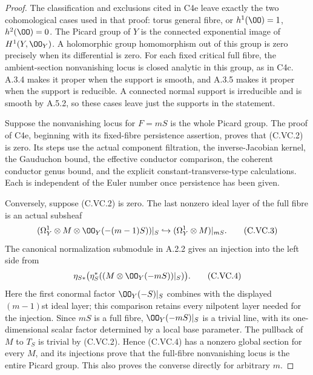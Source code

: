 \begin{proof}
The classification and exclusions cited in C4e leave
exactly the two cohomological cases used in that proof:
torus general fibre, or $h^1(\OO)=1$, $h^2(\OO)=0$.
The Picard group of $Y$ is the connected exponential image
of $H^1(Y,\OO_Y)$. A holomorphic group homomorphism out of
this group is zero precisely when its differential is zero.
For each fixed critical full fibre, the ambient-section
nonvanishing locus is closed analytic in this group, as
in C4c. A.3.4 makes it proper when the support is smooth,
and A.3.5 makes it proper when the support is reducible.
A connected normal support is irreducible and is smooth
by A.5.2, so these cases leave just the supports in the
statement.

Suppose the nonvanishing locus for $F=mS$ is the whole
Picard group. The proof of C4e, beginning with its
fixed-fibre persistence assertion, proves that (C.VC.2)
is zero. Its steps use the actual component filtration,
the inverse-Jacobian kernel, the Gauduchon bound, the
effective conductor comparison, the coherent conductor
genus bound, and the explicit constant-transverse-type
calculations. Each is independent of the Euler number
once persistence has been given.

Conversely, suppose (C.VC.2) is zero. The last nonzero
ideal layer of the full fibre is an actual subsheaf
\[
 (\Omega_Y^1\otimes M\otimes\OO_Y(-(m-1)S))|_S
 \hookrightarrow
          (\Omega_Y^1\otimes M)|_{mS}.
 \tag{C.VC.3}
\]
The canonical normalization submodule in A.2.2 gives
an injection into the left side from
\[
 \eta_{S*}\bigl(\eta_S^*((M\otimes\OO_Y(-mS))|_S)\bigr).
 \tag{C.VC.4}
\]
Here the first conormal factor $\OO_Y(-S)|_S$ combines
with the displayed $(m-1)$st ideal layer; this comparison
retains every nilpotent layer needed for the injection.
Since $mS$ is a full fibre, $\OO_Y(-mS)|_S$ is a trivial
line, with its one-dimensional scalar factor determined
by a local base parameter. The pullback of $M$ to $T_S$
is trivial by (C.VC.2). Hence (C.VC.4) has a nonzero global
section for every $M$, and its injections prove that the
full-fibre nonvanishing locus is the entire Picard group.
This also proves the converse directly for arbitrary $m$.


\end{proof}
